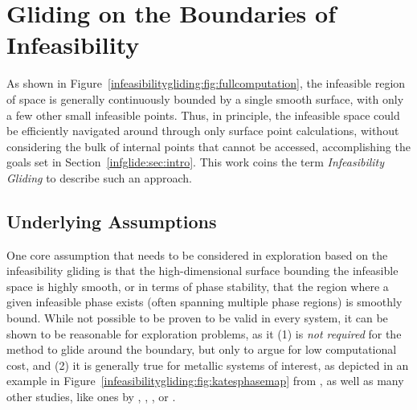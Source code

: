 \section{Gliding on the Boundaries of Infeasibility} \label{infglide:sec:glide}

As shown in Figure~\ref{infeasibilitygliding:fig:fullcomputation}, the infeasible region of space is generally continuously bounded by a single smooth surface, with only a few other small infeasible points. Thus, in principle, the infeasible space could be efficiently navigated around through only surface point calculations, without considering the bulk of internal points that cannot be accessed, accomplishing the goals set in Section~\ref{infglide:sec:intro}. This work coins the term \emph{Infeasibility Gliding} to describe such an approach.

\subsection{Underlying Assumptions} \label{infglide:ssec:assumptions}

One core assumption that needs to be considered in exploration based on the infeasibility gliding is that the high-dimensional surface bounding the infeasible space is highly smooth, or in terms of phase stability, that the region where a given infeasible phase exists (often spanning multiple phase regions) is smoothly bound. While not possible to be proven to be valid in every system, it can be shown to be reasonable for exploration problems, as it (1) is \emph{not required} for the method to glide around the boundary, but only to argue for low computational cost, and (2) it is generally true for metallic systems of interest, as depicted in an example in Figure~\ref{infeasibilitygliding:fig:katesphasemap} from \citet{Elder2023ComputationalValidation}, as well as many other studies, like ones by \citet{Bobbio2022DesignCompositions}, \citet{Sun2024MaterialsMap:Ag-Al-Cu}, \citet{Gao2016SenaryHfNbTaTiVZr}, or \citet{Zhao2014ExperimentalSystem}.

